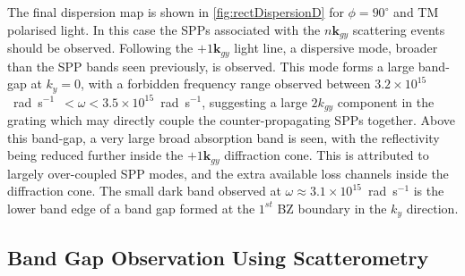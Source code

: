 The final dispersion map is shown in \ref{fig:rectDispersionD} for $\phi=90^\circ$ and TM polarised light. In this case the SPPs associated with the $n\mathbf{k}_{gy}$ scattering events should be observed. Following the $+1\mathbf{k}_{gy}$ light line, a dispersive mode, broader than the SPP bands seen previously, is observed. This mode forms a large band-gap at $k_y=0$, with a forbidden frequency range observed between \mbox{$3.2\times10^{15}$ rad s$^{-1}$ $<\omega<3.5\times10^{15}$ rad s$^{-1}$}, suggesting a large $2k_{gy}$ component in the grating which may directly couple the counter-propagating SPPs together. Above this band-gap, a very large broad absorption band is seen, with the reflectivity being reduced further inside the  $+1\mathbf{k}_{gy}$ diffraction cone. This is attributed to largely over-coupled SPP modes, and the extra available loss channels inside the diffraction cone. The small dark band observed at \mbox{$\omega\approx3.1\times10^{15}$ rad s$^{-1}$} is the lower band edge of a band gap formed at the $1^{st}$ BZ boundary in the $k_y$ direction.


\subsection{Band Gap Observation Using Scatterometry\label{s:rscat}}

